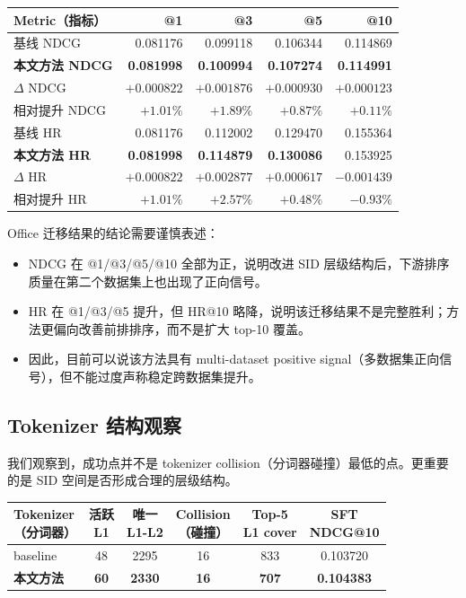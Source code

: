 \documentclass[11pt]{article}
\begin{document}
\begin{center}
\begin{tabular}{lrrrr}
\toprule
Metric（指标） & @1 & @3 & @5 & @10 \\
\midrule
基线 NDCG & 0.081176 & 0.099118 & 0.106344 & 0.114869 \\
\textbf{本文方法 NDCG} & \textbf{0.081998} & \textbf{0.100994} & \textbf{0.107274} & \textbf{0.114991} \\
$\Delta$ NDCG & $+0.000822$ & $+0.001876$ & $+0.000930$ & $+0.000123$ \\
相对提升 NDCG & $+1.01\%$ & $+1.89\%$ & $+0.87\%$ & $+0.11\%$ \\
\midrule
基线 HR & 0.081176 & 0.112002 & 0.129470 & 0.155364 \\
\textbf{本文方法 HR} & \textbf{0.081998} & \textbf{0.114879} & \textbf{0.130086} & 0.153925 \\
$\Delta$ HR & $+0.000822$ & $+0.002877$ & $+0.000617$ & $-0.001439$ \\
相对提升 HR & $+1.01\%$ & $+2.57\%$ & $+0.48\%$ & $-0.93\%$ \\
\bottomrule
\end{tabular}
\end{center}

Office 迁移结果的结论需要谨慎表述：

\begin{itemize}
  \item NDCG 在 @1/@3/@5/@10 全部为正，说明改进 SID 层级结构后，下游排序质量在第二个数据集上也出现了正向信号。
  \item HR 在 @1/@3/@5 提升，但 HR@10 略降，说明该迁移结果不是完整胜利；方法更偏向改善前排排序，而不是扩大 top-10 覆盖。
  \item 因此，目前可以说该方法具有 multi-dataset positive signal（多数据集正向信号），但不能过度声称稳定跨数据集提升。
\end{itemize}

\subsection{Tokenizer 结构观察}

我们观察到，成功点并不是 tokenizer collision（分词器碰撞）最低的点。更重要的是 SID 空间是否形成合理的层级结构。

\begin{center}
\small
\begin{tabular}{lccccc}
\toprule
\shortstack{Tokenizer\\（分词器）}
& \shortstack{活跃\\L1}
& \shortstack{唯一\\L1-L2}
& \shortstack{Collision\\（碰撞）}
& \shortstack{Top-5\\L1 cover}
& \shortstack{SFT\\NDCG@10} \\
\midrule
baseline & 48 & 2295 & 16 & 833 & 0.103720 \\
\textbf{本文方法} & \textbf{60} & \textbf{2330} & \textbf{16} & \textbf{707} & \textbf{0.104383} \\
\bottomrule
\end{tabular}
\end{center}
\end{document}
